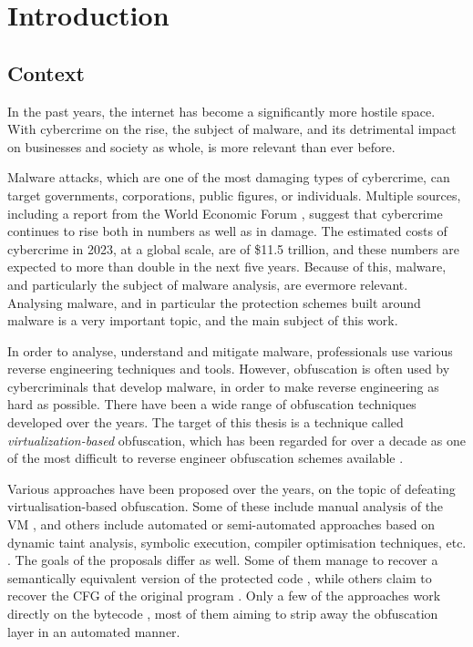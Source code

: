 \chapter{Introduction}

\section{Context}

In the past years, the internet has become a significantly more hostile space. With cybercrime on the rise, the subject of malware, and its detrimental impact on businesses and society as whole, is more relevant than ever before. 

Malware attacks, which are one of the most damaging types of cybercrime, can target governments, corporations, public figures, or individuals. Multiple sources, including a report from the World Economic Forum \cite{wef_cybercrime}, suggest that cybercrime continues to rise both in numbers as well as in damage. The estimated costs of cybercrime in 2023, at a global scale, are of \$11.5 trillion, and these numbers are expected to more than double in the next five years. Because of this, malware, and particularly the subject of malware analysis, are evermore relevant. Analysing malware, and in particular the protection schemes built around malware is a very important topic, and the main subject of this work.

In order to analyse, understand and mitigate malware, professionals use various reverse engineering techniques and tools. However, obfuscation is often used by cybercriminals that develop malware, in order to make reverse engineering as hard as possible. There have been a wide range of obfuscation techniques developed over the years. The target of this thesis is a technique called \emph{virtualization-based} obfuscation, which has been regarded for over a decade as one of the most difficult to reverse engineer obfuscation schemes available \cite{dang2014practical}.

Various approaches have been proposed over the years, on the topic of defeating virtualisation-based obfuscation. Some of these include manual analysis of the \gls{VM} \cite{rolles2009unpacking}, and others include automated or semi-automated approaches based on dynamic taint analysis, symbolic execution, compiler optimisation techniques, etc. \cite{tang2017seead} \cite{symbolic_deobf_2018}. The goals of the proposals differ as well. Some of them manage to recover a semantically equivalent version of the protected code \cite{symbolic_deobf_2018}, while others claim to recover the \gls{CFG} of the original program \cite{yadegari2015}. Only a few of the approaches work directly on the bytecode \cite{sharif2009}, most of them aiming to strip away the obfuscation layer in an automated manner.

